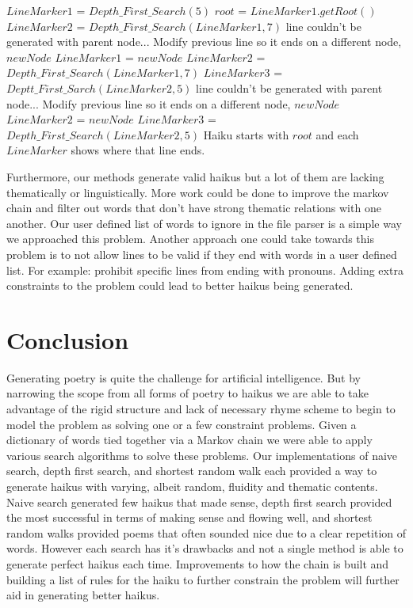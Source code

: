 \documentclass[]{article}
\begin{document}
\begin{algorithm}[H]
	\caption{$Depth\_First\_Search\_Whole\_Haiku()$} \label{Alg:DFSWhole}
	\begin{algorithmic}[1]
		\State $LineMarker1$ = $Depth\_First\_Search(5)$
		\State $root$ = $LineMarker1.getRoot()$
		\State $LineMarker2$ = $Depth\_First\_Search(LineMarker1, 7)$
		 line couldn't be generated with parent node...
			\State Modify previous line so it ends on a different node, $newNode$
			\State $LineMarker1$ = $newNode$
			\State $LineMarker2$ = $Depth\_First\_Search(LineMarker1,7)$
		\EndIf
		\State $LineMarker3$ = $Deptt\_First\_Sarch(LineMarker2,5)$
		 line couldn't be generated with parent node...
			\State Modify previous line so it ends on a different node, $newNode$
			\State $LineMarker2$ = $newNode$
			\State $LineMarker3$ = $Depth\_First\_Search(LineMarker2,5)$
		\EndIf
		\State Haiku starts with $root$ and each $LineMarker$ shows where that line ends.
	\end{algorithmic}
\end{algorithm}

Furthermore, our methods generate valid haikus but a lot of them are lacking thematically or linguistically. More work could be done to improve the markov chain and filter out words that don't have strong thematic relations with one another. Our user defined list of words to ignore in the file parser is a simple way we approached this problem. Another approach one could take towards this problem is to not allow lines to be valid if they end with words in a user defined list. For example: prohibit specific lines from ending with pronouns. Adding extra constraints to the problem could lead to better haikus being generated.

\section{Conclusion}
Generating poetry is quite the challenge for artificial intelligence. But by narrowing the scope from all forms of poetry to haikus we are able to take advantage of the rigid structure and lack of necessary rhyme scheme to begin to model the problem as solving one or a few constraint problems. Given a dictionary of words tied together via a Markov chain we were able to apply various search algorithms to solve these problems. Our implementations of naive search, depth first search, and shortest random walk each provided a way to generate haikus with varying, albeit random, fluidity and thematic contents. Naive search generated few haikus that made sense, depth first search provided the most successful in terms of making sense and flowing well, and shortest random walks provided poems that often sounded nice due to a clear repetition of words. However each search has it's drawbacks and not a single method is able to generate perfect haikus each time. Improvements to how the chain is built and building a list of rules for the haiku to further constrain the problem will further aid in generating better haikus.



\end{document}
